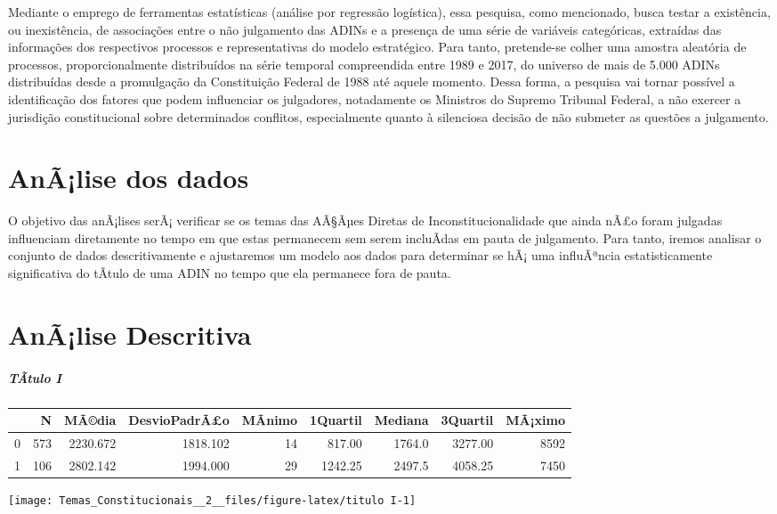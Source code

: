 \documentclass[]{article}
\let\oldsubparagraph\subparagraph
\renewcommand{\subparagraph}[1]{\oldsubparagraph{#1}\mbox{}}
\begin{document}
Mediante o emprego de ferramentas estatísticas (análise por regressão
logística), essa pesquisa, como mencionado, busca testar a existência,
ou inexistência, de associações entre o não julgamento das ADINs e a
presença de uma série de variáveis categóricas, extraídas das
informações dos respectivos processos e representativas do modelo
estratégico. Para tanto, pretende-se colher uma amostra aleatória de
processos, proporcionalmente distribuídos na série temporal compreendida
entre 1989 e 2017, do universo de mais de 5.000 ADINs distribuídas desde
a promulgação da Constituição Federal de 1988 até aquele momento. Dessa
forma, a pesquisa vai tornar possível a identificação dos fatores que
podem influenciar os julgadores, notadamente os Ministros do Supremo
Tribunal Federal, a não exercer a jurisdição constitucional sobre
determinados conflitos, especialmente quanto à silenciosa decisão de não
submeter as questões a julgamento.

\section{AnÃ¡lise dos dados}\label{analise-dos-dados}

O objetivo das anÃ¡lises serÃ¡ verificar se os temas das AÃ§Ãµes Diretas
de Inconstitucionalidade que ainda nÃ£o foram julgadas influenciam
diretamente no tempo em que estas permanecem sem serem incluÃ­das em
pauta de julgamento. Para tanto, iremos analisar o conjunto de dados
descritivamente e ajustaremos um modelo aos dados para determinar se hÃ¡
uma influÃªncia estatisticamente significativa do tÃ­tulo de uma ADIN no
tempo que ela permanece fora de pauta.

\section{AnÃ¡lise Descritiva}\label{analise-descritiva}

\subparagraph{TÃ­tulo I}\label{tatulo-i}

\begin{longtable}[]{@{}lrrrrrrrr@{}}
\toprule
& N & MÃ©dia & DesvioPadrÃ£o & MÃ­nimo & 1Quartil & Mediana & 3Quartil &
MÃ¡ximo\tabularnewline
\midrule
\endhead
0 & 573 & 2230.672 & 1818.102 & 14 & 817.00 & 1764.0 & 3277.00 &
8592\tabularnewline
1 & 106 & 2802.142 & 1994.000 & 29 & 1242.25 & 2497.5 & 4058.25 &
7450\tabularnewline
\bottomrule
\end{longtable}

\begin{center}\texttt{[image: Temas\_Constitucionais\_\_2\_\_files/figure-latex/titulo I-1]} \end{center}
\end{document}
